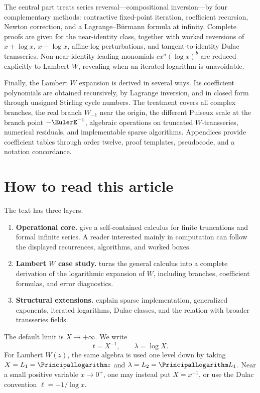 \documentclass[11pt,openany]{book}
\theoremstyle{definition}
\theoremstyle{plain}
\theoremstyle{remark}
\begin{document}
The central part treats series reversal---compositional inversion---by four complementary methods: contractive fixed-point iteration, coefficient recursion, Newton correction, and a Lagrange--B\"urmann formula at infinity. Complete proofs are given for the near-identity class, together with worked reversions of \(x+\log x\), \(x-\log x\), affine-log perturbations, and tangent-to-identity Dulac transseries. Non-near-identity leading monomials \(cx^a(\log x)^b\) are reduced explicitly to Lambert \(W\), revealing when an iterated logarithm is unavoidable.

Finally, the Lambert \(W\) expansion is derived in several ways. Its coefficient polynomials are obtained recursively, by Lagrange inversion, and in closed form through unsigned Stirling cycle numbers. The treatment covers all complex branches, the real branch \(W_{-1}\) near the origin, the different Puiseux scale at the branch point \(-\EulerE^{-1}\), algebraic operations on truncated \(W\)-transseries, numerical residuals, and implementable sparse algorithms. Appendices provide coefficient tables through order twelve, proof templates, pseudocode, and a notation concordance.

\chapter*{How to read this article}
The text has three layers.

\begin{enumerate}
\item \textbf{Operational core.}  give a self-contained calculus for finite truncations and formal infinite series. A reader interested mainly in computation can follow the displayed recurrences, algorithms, and worked boxes.
\item \textbf{Lambert \(W\) case study.}  turns the general calculus into a complete derivation of the logarithmic expansion of \(W\), including branches, coefficient formulas, and error diagnostics.
\item \textbf{Structural extensions.}  explain sparse implementation, generalized exponents, iterated logarithms, Dulac classes, and the relation with broader transseries fields.
\end{enumerate}

The default limit is \(X\to+\infty\). We write
\[
 t=X^{-1},\qquad \lambda=\log X.
\]
For Lambert \(W(z)\), the same algebra is used one level down by taking \(X=L_1=\PrincipalLogarithm z\) and \(\lambda=L_2=\PrincipalLogarithm L_1\). Near a small positive variable \(x\to0^+\), one may instead put \(X=x^{-1}\), or use the Dulac convention \(\ell=-1/\log x\).
\end{document}
